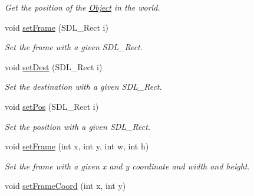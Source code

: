 \begin{DoxyCompactItemize}
\begin{DoxyCompactList}\small\item\em Get the position of the \hyperlink{classObject}{Object} in the world. \end{DoxyCompactList}\item 
void \hyperlink{classObject_a720ff968db3849ae49437fc8d01246ef}{set\+Frame} (S\+D\+L\+\_\+\+Rect i)\hypertarget{classObject_a720ff968db3849ae49437fc8d01246ef}{}\label{classObject_a720ff968db3849ae49437fc8d01246ef}

\begin{DoxyCompactList}\small\item\em Set the frame with a given S\+D\+L\+\_\+\+Rect. \end{DoxyCompactList}\item 
void \hyperlink{classObject_ae2dc77ca41ab1a49aa15c97539d28f5c}{set\+Dest} (S\+D\+L\+\_\+\+Rect i)\hypertarget{classObject_ae2dc77ca41ab1a49aa15c97539d28f5c}{}\label{classObject_ae2dc77ca41ab1a49aa15c97539d28f5c}

\begin{DoxyCompactList}\small\item\em Set the destination with a given S\+D\+L\+\_\+\+Rect. \end{DoxyCompactList}\item 
void \hyperlink{classObject_adc0bcac930604c018ddf3c0129f50317}{set\+Pos} (S\+D\+L\+\_\+\+Rect i)\hypertarget{classObject_adc0bcac930604c018ddf3c0129f50317}{}\label{classObject_adc0bcac930604c018ddf3c0129f50317}

\begin{DoxyCompactList}\small\item\em Set the position with a given S\+D\+L\+\_\+\+Rect. \end{DoxyCompactList}\item 
void \hyperlink{classObject_a52bedccbb5a658daf8c8ef2abbd5d76e}{set\+Frame} (int x, int y, int w, int h)\hypertarget{classObject_a52bedccbb5a658daf8c8ef2abbd5d76e}{}\label{classObject_a52bedccbb5a658daf8c8ef2abbd5d76e}

\begin{DoxyCompactList}\small\item\em Set the frame with a given x and y coordinate and width and height. \end{DoxyCompactList}\item 
void \hyperlink{classObject_ab2213d14a8983028d49192d49770e0bc}{set\+Frame\+Coord} (int x, int y)\hypertarget{classObject_ab2213d14a8983028d49192d49770e0bc}{}\label{classObject_ab2213d14a8983028d49192d49770e0bc}


\end{DoxyCompactItemize}
